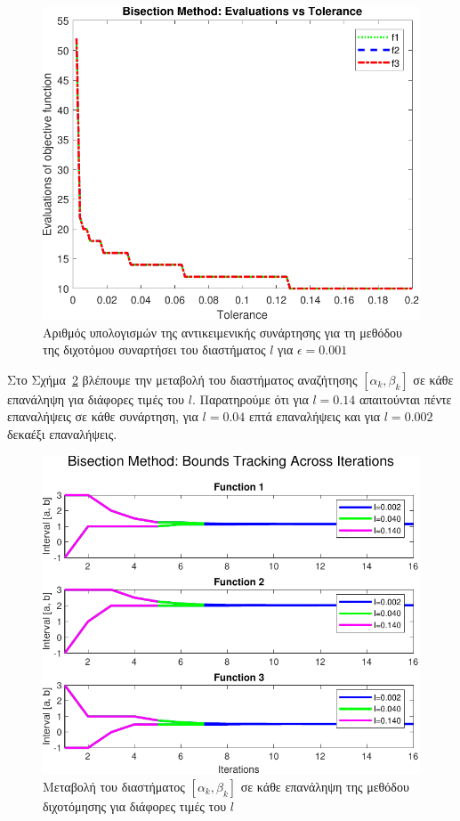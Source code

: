 \documentclass{article}
\begin{document}
\begin{figure}
    \centering
    \includegraphics[width=0.75\linewidth]{plots/task1_plot2.pdf}
    \caption{Αριθμός υπολογισμών της αντικειμενικής συνάρτησης για τη μεθόδου της διχοτόμου συναρτήσει του διαστήματος $l$ για $\epsilon = 0.001$}
    \label{fig:task1_plot2}
\end{figure}

Στο Σχήμα~\ref{fig:task1_plot3} βλέπουμε την μεταβολή του διαστήματος αναζήτησης $[\alpha_k, \beta_k]$ 
σε κάθε επανάληψη για διάφορες τιμές του $l$. Παρατηρούμε ότι για $l = 0.14$ απαιτούνται πέντε
επαναλήψεις σε κάθε συνάρτηση, για $l = 0.04$ επτά επαναλήψεις και για $l = 0.002$ δεκαέξι επαναλήψεις.

\begin{figure}
    \centering
    \includegraphics[width=0.75\linewidth]{plots/task1_plot3.pdf}
    \caption{Μεταβολή του διαστήματος $[\alpha_k, \beta_k]$ σε κάθε επανάληψη της μεθόδου διχοτόμησης για διάφορες τιμές του $l$}
    \label{fig:task1_plot3}
\end{figure}
\end{document}
